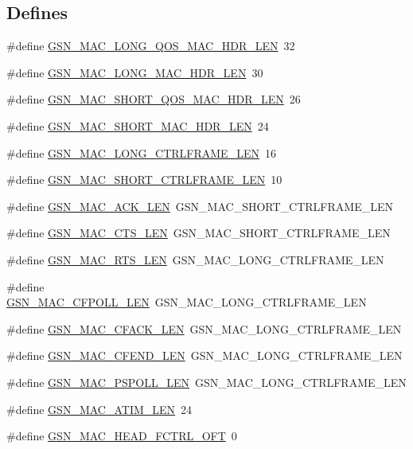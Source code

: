 \subsection*{Defines}
\begin{DoxyCompactItemize}
\item 
\#define \hyperlink{a00523_a56596bc4eab4b1eb9bf06a08df3a4396}{GSN\_\-MAC\_\-LONG\_\-QOS\_\-MAC\_\-HDR\_\-LEN}~32
\item 
\#define \hyperlink{a00523_a8cfe86cea20467975bc8f29ffa02e51a}{GSN\_\-MAC\_\-LONG\_\-MAC\_\-HDR\_\-LEN}~30
\item 
\#define \hyperlink{a00523_a994deebc682a29005c926f23174abab2}{GSN\_\-MAC\_\-SHORT\_\-QOS\_\-MAC\_\-HDR\_\-LEN}~26
\item 
\#define \hyperlink{a00523_af70d09cf42757e280b3df6217aaf96b9}{GSN\_\-MAC\_\-SHORT\_\-MAC\_\-HDR\_\-LEN}~24
\item 
\#define \hyperlink{a00523_a736bd74b44599f93be53e955ffe42c00}{GSN\_\-MAC\_\-LONG\_\-CTRLFRAME\_\-LEN}~16
\item 
\#define \hyperlink{a00523_a923fa5330f7daee6ba7722a78be7b84a}{GSN\_\-MAC\_\-SHORT\_\-CTRLFRAME\_\-LEN}~10
\item 
\#define \hyperlink{a00523_affaed9a7768b7cf27e51be6b57f685d9}{GSN\_\-MAC\_\-ACK\_\-LEN}~GSN\_\-MAC\_\-SHORT\_\-CTRLFRAME\_\-LEN
\item 
\#define \hyperlink{a00523_a77bdfde16f3b56e7c5741330fd06aeb2}{GSN\_\-MAC\_\-CTS\_\-LEN}~GSN\_\-MAC\_\-SHORT\_\-CTRLFRAME\_\-LEN
\item 
\#define \hyperlink{a00523_afb717d3bd8f1cbdee5897907fc55887e}{GSN\_\-MAC\_\-RTS\_\-LEN}~GSN\_\-MAC\_\-LONG\_\-CTRLFRAME\_\-LEN
\item 
\#define \hyperlink{a00523_ab902a1d8f0597a19b93793172f704d21}{GSN\_\-MAC\_\-CFPOLL\_\-LEN}~GSN\_\-MAC\_\-LONG\_\-CTRLFRAME\_\-LEN
\item 
\#define \hyperlink{a00523_aa27491b093780af77bdfb83de8b8e1eb}{GSN\_\-MAC\_\-CFACK\_\-LEN}~GSN\_\-MAC\_\-LONG\_\-CTRLFRAME\_\-LEN
\item 
\#define \hyperlink{a00523_a6d115297bc911bba891f99e2a3ea7db4}{GSN\_\-MAC\_\-CFEND\_\-LEN}~GSN\_\-MAC\_\-LONG\_\-CTRLFRAME\_\-LEN
\item 
\#define \hyperlink{a00523_ac346c12dcdf47dc4cea4787c23f0223b}{GSN\_\-MAC\_\-PSPOLL\_\-LEN}~GSN\_\-MAC\_\-LONG\_\-CTRLFRAME\_\-LEN
\item 
\#define \hyperlink{a00523_a5368be5a9fe35b1667e69eab4e5fad3d}{GSN\_\-MAC\_\-ATIM\_\-LEN}~24
\item 
\#define \hyperlink{a00523_a1ef5f080a6f0f988d53b1c834c603047}{GSN\_\-MAC\_\-HEAD\_\-FCTRL\_\-OFT}~0

\end{DoxyCompactItemize}
